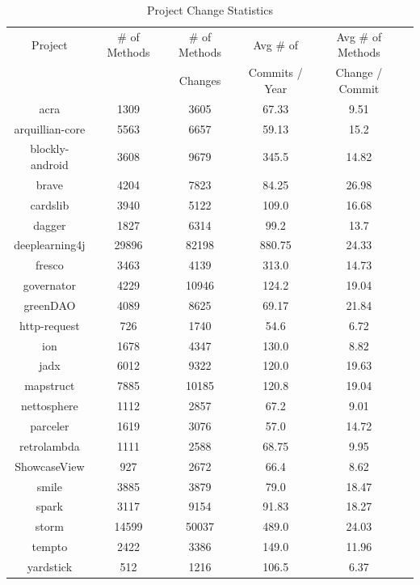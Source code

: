\begin{table}
\begin{center}
    \begin{tabular}{|c|c|c|c|c|c|}
        \hline
        Project & \# of Methods & \# of Methods & Avg \# of & Avg \# of Methods \\
         & & Changes & Commits / Year & Change / Commit \\
        \hline
        acra & 1309 & 3605 & 67.33 & 9.51 \\
        arquillian-core & 5563 & 6657 & 59.13 & 15.2 \\
        blockly-android & 3608 & 9679 & 345.5 & 14.82 \\
        brave & 4204 & 7823 & 84.25 & 26.98 \\
        cardslib & 3940 & 5122 & 109.0 & 16.68 \\
        dagger & 1827 & 6314 & 99.2 & 13.7 \\
        deeplearning4j & 29896 & 82198 & 880.75 & 24.33 \\
        fresco & 3463 & 4139 & 313.0 & 14.73 \\
        governator & 4229 & 10946 & 124.2 & 19.04 \\
        greenDAO & 4089 & 8625 & 69.17 & 21.84 \\
        http-request & 726 & 1740 & 54.6 & 6.72 \\
        ion & 1678 & 4347 & 130.0 & 8.82 \\
        jadx & 6012 & 9322 & 120.0 & 19.63 \\
        mapstruct & 7885 & 10185 & 120.8 & 19.04 \\
        nettosphere & 1112 & 2857 & 67.2 & 9.01 \\
        parceler & 1619 & 3076 & 57.0 & 14.72 \\
        retrolambda & 1111 & 2588 & 68.75 & 9.95 \\
        ShowcaseView & 927 & 2672 & 66.4 & 8.62 \\
        smile & 3885 & 3879 & 79.0 & 18.47 \\
        spark & 3117 & 9154 & 91.83 & 18.27 \\
        storm & 14599 & 50037 & 489.0 & 24.03 \\
        tempto & 2422 & 3386 & 149.0 & 11.96 \\
        yardstick & 512 & 1216 & 106.5 & 6.37 \\
        \hline
    \end{tabular}
\end{center}
\caption{Project Change Statistics}
\label{tab:project_stats}
\end{table}

